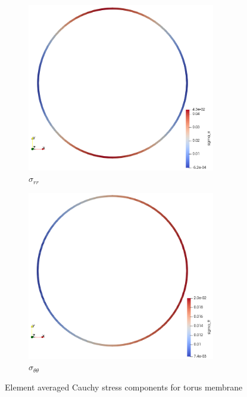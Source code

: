 \documentclass[11pt,a4paper,final]{article}
\begin{document}
\begin{figure}[ht!]
\centering 
\begin{subfigure}[b]{0.49\textwidth}
\centering
\includegraphics[width=0.9\textwidth]{torus_avg_sigma_rr_mue_1000.png}
\caption{$\sigma_{rr}$}
\label{fig:1.11.1}
\end{subfigure}
\begin{subfigure}[b]{0.49\textwidth}
\centering
\includegraphics[width=0.9\textwidth]{torus_avg_sigma_theta_mue_1000.png}
\caption{$\sigma_{\theta \theta}$}
\label{fig:1.11.2}
\end{subfigure}
\caption{Element averaged Cauchy stress components for torus membrane}
\label{fig:1.11}
\end{figure} 
\end{document}
